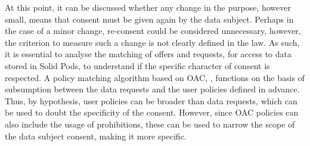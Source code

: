 At this point, it can be discussed whether any change in the purpose, however small, means that consent must be given again by the data subject.
Perhaps in the case of a minor change, re-consent could be considered unnecessary, however, the criterion to measure such a change is not clearly defined in the law. 
As such, it is essential to analyse the matching of offers and requests, for access to data stored in Solid Pods, to understand if the specific character of consent is respected.
A policy matching algorithm based on OAC, , functions on the basis of subsumption between the data requests and the user policies defined in advance.
Thus, by hypothesis, user policies can be broader than data requests, which can be used to doubt the specificity of the consent.
However, since OAC policies can also include the usage of prohibitions, these can be used to narrow the scope of the data subject consent, making it more specific.


